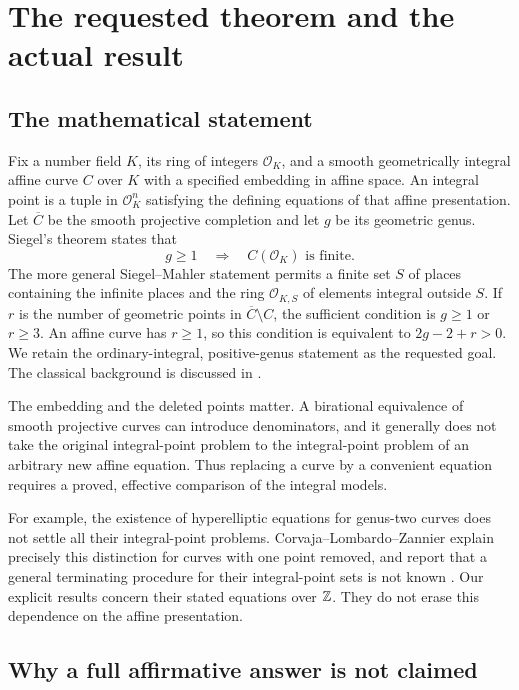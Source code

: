 \section{The requested theorem and the actual result}

\subsection{The mathematical statement}

Fix a number field $K$, its ring of integers $\mathcal O_K$, and a smooth
geometrically integral affine curve $C$ over $K$ with a specified embedding
in affine space. An integral point is a tuple in $\mathcal O_K^n$ satisfying
the defining equations of that affine presentation. Let $\overline C$ be
the smooth projective completion and let $g$ be its geometric genus.
Siegel's theorem states that
\[
 g\ge1\quad\Longrightarrow\quad C(\mathcal O_K)\text{ is finite}.
\]
The more general Siegel--Mahler statement permits a finite set $S$ of places
containing the infinite places and the ring $\mathcal O_{K,S}$ of elements
integral outside $S$. If $r$ is the number of geometric points in
$\overline C\setminus C$, the sufficient condition is $g\ge1$ or $r\ge3$.
An affine curve has $r\ge1$, so this condition is equivalent to
$2g-2+r>0$. We retain the ordinary-integral, positive-genus statement as
the requested goal. The classical background is discussed in
\cite{BiluIllengo2009,CorvajaZannier2002}.

The embedding and the deleted points matter. A birational equivalence of
smooth projective curves can introduce denominators, and it generally does
not take the original integral-point problem to the integral-point problem
of an arbitrary new affine equation. Thus replacing a curve by a convenient
equation requires a proved, effective comparison of the integral models.

For example, the existence of hyperelliptic equations for genus-two curves
does not settle all their integral-point problems. Corvaja--Lombardo--Zannier
explain precisely this distinction for curves with one point removed, and
report that a general terminating procedure for their integral-point sets
is not known \cite[Introduction and Remark 1.2]{CorvajaLombardoZannier2024}.
Our explicit results concern their stated equations over $\mathbb Z$. They do not
erase this dependence on the affine presentation.

\subsection{Why a full affirmative answer is not claimed}

